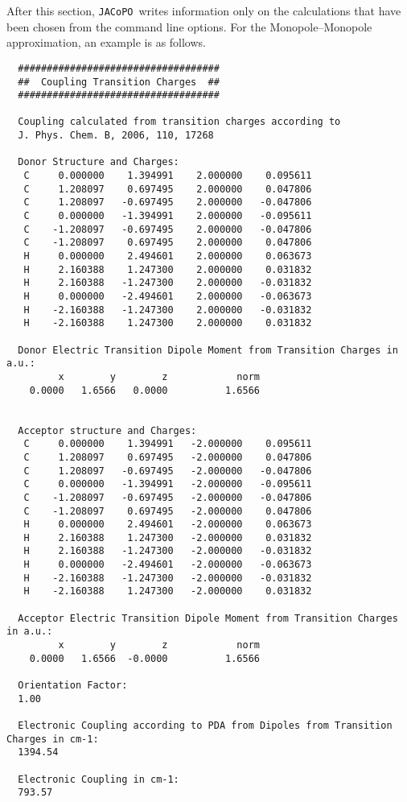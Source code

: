\documentclass[a4paper]{article}
\newcommand{\jacopo}{\texttt{JACoPO}}
\begin{document}
After this section, \jacopo\ writes information only on the calculations that have been chosen from the command line options.
For the Monopole--Monopole approximation, an example is as follows.

\begin{verbatim}
  ###################################
  ##  Coupling Transition Charges  ##
  ###################################
  
  Coupling calculated from transition charges according to
  J. Phys. Chem. B, 2006, 110, 17268
  
  Donor Structure and Charges:
   C     0.000000    1.394991    2.000000    0.095611
   C     1.208097    0.697495    2.000000    0.047806
   C     1.208097   -0.697495    2.000000   -0.047806
   C     0.000000   -1.394991    2.000000   -0.095611
   C    -1.208097   -0.697495    2.000000   -0.047806
   C    -1.208097    0.697495    2.000000    0.047806
   H     0.000000    2.494601    2.000000    0.063673
   H     2.160388    1.247300    2.000000    0.031832
   H     2.160388   -1.247300    2.000000   -0.031832
   H     0.000000   -2.494601    2.000000   -0.063673
   H    -2.160388   -1.247300    2.000000   -0.031832
   H    -2.160388    1.247300    2.000000    0.031832
  
  Donor Electric Transition Dipole Moment from Transition Charges in a.u.:
         x        y        z            norm
    0.0000   1.6566   0.0000          1.6566
  
  
  Acceptor structure and Charges:
   C     0.000000    1.394991   -2.000000    0.095611
   C     1.208097    0.697495   -2.000000    0.047806
   C     1.208097   -0.697495   -2.000000   -0.047806
   C     0.000000   -1.394991   -2.000000   -0.095611
   C    -1.208097   -0.697495   -2.000000   -0.047806
   C    -1.208097    0.697495   -2.000000    0.047806
   H     0.000000    2.494601   -2.000000    0.063673
   H     2.160388    1.247300   -2.000000    0.031832
   H     2.160388   -1.247300   -2.000000   -0.031832
   H     0.000000   -2.494601   -2.000000   -0.063673
   H    -2.160388   -1.247300   -2.000000   -0.031832
   H    -2.160388    1.247300   -2.000000    0.031832
  
  Acceptor Electric Transition Dipole Moment from Transition Charges in a.u.:
         x        y        z            norm
    0.0000   1.6566  -0.0000          1.6566
  
  Orientation Factor:
  1.00
  
  Electronic Coupling according to PDA from Dipoles from Transition Charges in cm-1:
  1394.54   
  
  Electronic Coupling in cm-1:
  793.57 
\end{verbatim}
\end{document}
